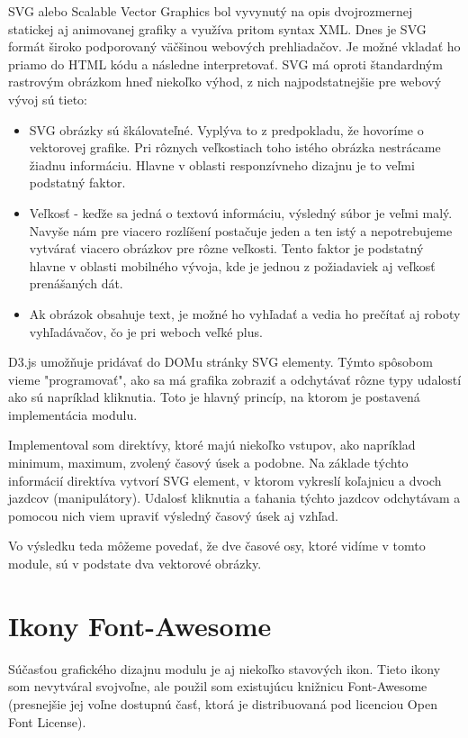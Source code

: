 \documentclass[
  digital, %
  twoside, %
  notable,   %
  nolof,   %
  nolot,   %
]{fithesis3}
\begin{document}
SVG alebo Scalable Vector Graphics bol vyvynutý na opis dvojrozmernej statickej aj animovanej grafiky a využíva pritom syntax XML\cite{quint2003scalable}.
Dnes je SVG formát široko podporovaný väčšinou webových prehliadačov. Je možné vkladať ho priamo do HTML kódu a následne interpretovať. SVG má oproti štandardným rastrovým obrázkom hneď niekoľko výhod, z nich najpodstatnejšie pre webový vývoj sú tieto:
\begin{itemize}
\item SVG obrázky sú škálovateľné. Vyplýva to z predpokladu, že hovoríme o vektorovej grafike. Pri rôznych veľkostiach toho istého obrázka nestrácame žiadnu informáciu. Hlavne v oblasti responzívneho dizajnu je to veľmi podstatný faktor.
\item Veľkosť - keďže sa jedná o textovú informáciu, výsledný súbor je veľmi malý. Navyše nám pre viacero rozlíšení postačuje jeden a ten istý a nepotrebujeme vytvárať viacero obrázkov pre rôzne veľkosti. Tento faktor je podstatný hlavne v oblasti mobilného vývoja, kde je jednou z požiadaviek aj veľkosť prenášaných dát.
\item Ak obrázok obsahuje text, je možné ho vyhľadať a vedia ho prečítať aj roboty vyhľadávačov, čo je pri weboch veľké plus.
\end{itemize}

D3.js umožňuje pridávať do DOMu stránky SVG elementy. Týmto spôsobom vieme "programovať", ako sa má grafika zobraziť a odchytávať rôzne typy udalostí ako sú napríklad kliknutia. Toto je hlavný princíp, na ktorom je postavená implementácia modulu.

Implementoval som direktívy, ktoré majú niekoľko vstupov, ako napríklad minimum, maximum, zvolený časový úsek a podobne. Na základe týchto informácií direktíva vytvorí SVG element, v ktorom vykreslí koľajnicu a dvoch jazdcov (manipulátory). Udalosť kliknutia a ťahania týchto jazdcov odchytávam a pomocou nich viem upraviť výsledný časový úsek aj vzhľad.

Vo výsledku teda môžeme povedať, že dve časové osy, ktoré vidíme v tomto module, sú v podstate dva vektorové obrázky.

\section{Ikony Font-Awesome}
Súčasťou grafického dizajnu modulu je aj niekoľko stavových ikon. Tieto ikony som nevytváral svojvoľne, ale použil som existujúcu knižnicu Font-Awesome (presnejšie jej voľne dostupnú časť, ktorá je distribuovaná pod licenciou Open Font License).
\end{document}
